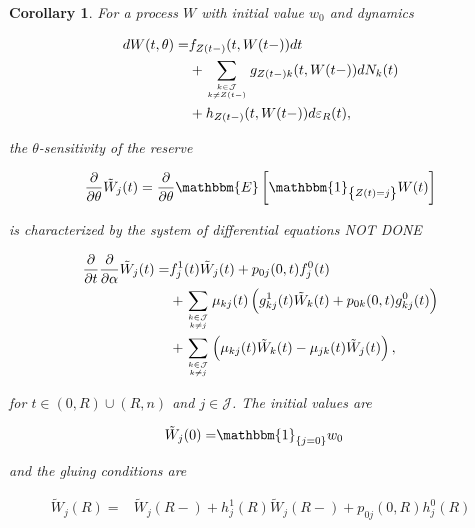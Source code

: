\documentclass{book}
\newcommand{\1}[1]{\mathbbm{1}_{\left\lbrace #1 \right\rbrace}}
\newcommand{\expec}[1][def]{\mathbbm{E} \left[ #1 \right]}
\theoremstyle{break}
\newtheorem{corollary}[definition]{Corollary}
\theoremstyle{remark}
\numberwithin{equation}{section}
\begin{document}
\begin{corollary} \label{Corollary}
	For a process $W$ with initial value $w_0$ and dynamics
	
	\begin{align*}
		dW(t,\theta) =& f_{Z(t-)}(t,W(t-)) dt \\
		&+ \sum_{k \in \mathcal{J} \atop k \neq Z(t-)} g_{Z(t-)k}(t,W(t-)) dN_{k}(t) \\
		&+ h_{Z(t-)}(t,W(t-)) d \varepsilon_R(t),
	\end{align*}

	the $\theta$-sensitivity of the reserve
	
	\begin{align*}
		\frac{\partial}{\partial \theta} \tilde{W}_j(t) = \frac{\partial}{\partial \theta} \expec[\1{Z(t)=j} W(t)]
	\end{align*}
	
	is characterized by the system of differential equations NOT DONE
	
	\begin{align*}
		\frac{\partial}{\partial t} \frac{\partial}{\partial \alpha} \tilde{W}_j(t) =& f_j^1(t) \tilde{W}_j(t) + p_{0j}(0,t) f_j^0(t) \\
		&+ \sum_{k \in \mathcal{J} \atop k \neq j} \mu_{kj}(t) \left( g_{kj}^1(t) \tilde{W}_k(t) + p_{0k}(0,t) g_{kj}^0(t) \right) \\
		&+ \sum_{k \in \mathcal{J} \atop k \neq j} \left( \mu_{kj}(t) \tilde{W}_k(t) - \mu_{jk}(t) \tilde{W}_j(t) \right),
	\end{align*}
	
	for $t \in (0,R)\cup(R,n)$ and $j \in \mathcal{J}$. The initial values are
	
	\begin{align*}
		\tilde{W}_j(0) =& \1{j=0} w_0
	\end{align*}
	
	and the gluing conditions are
	
	\begin{align*}
		\tilde{W}_j(R) =& \tilde{W}_j(R-) + h_j^1(R) \tilde{W}_j(R-) + p_{0j}(0,R) h_j^0(R)
	\end{align*}
\end{corollary}
\end{document}
